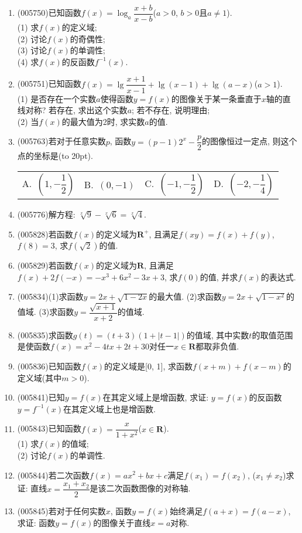 \documentclass[10pt,a4paper]{article}
\newcommand{\bracket}[1]{(\hbox to #1pt{})}
\newcommand{\fourch}[4]{\par\begin{tabular}{p{.23\textwidth}p{.23\textwidth}p{.23\textwidth}p{.23\textwidth}}
A.~#1 &B.~#2& C.~#3& D.~#4
\end{tabular}}
\begin{document}
\begin{enumerate}[1.]
\item {\tiny (005750)}已知函数$f(x)=\log_a\dfrac{x+b}{x-b}$($a>0$, $b>0$且$a\ne 1$).\\
(1) 求$f(x)$的定义域;\\
(2) 讨论$f(x)$的奇偶性;\\
(3) 讨论$f(x)$的单调性;\\
(4) 求$f(x)$的反函数$f^{-1}(x)$.
\item {\tiny (005751)}已知函数$f(x)=\lg \dfrac{x+1}{x-1}+\lg (x-1)+\lg (a-x)$($a>1$).\\
(1) 是否存在一个实数$a$使得函数$y=f(x)$的图像关于某一条垂直于$x$轴的直线对称? 若存在, 求出这个实数$a$; 若不存在, 说明理由;\\
(2) 当$f(x)$的最大值为2时, 求实数$a$的值.
\item {\tiny (005763)}若对于任意实数$p$, 函数$y=(p-1)2^x-\dfrac p2$的图像恒过一定点, 则这个点的坐标是\bracket{20}.
\fourch{$(1,-\dfrac 12)$}{$(0, -1)$}{$(-1,-\dfrac 12)$}{$(-2,-\dfrac 14)$}
\item {\tiny (005776)}解方程: $\sqrt[x]9-\sqrt[x]6=\sqrt[x]4$.
\item {\tiny (005828)}若函数$f(x)$的定义域为$\mathbf{R}^+$, 且满足$f(xy)=f(x)+f(y)$, $f(8)=3$, 求$f(\sqrt 2)$的值.
\item {\tiny (005829)}若函数$f(x)$的定义域为$\mathbf{R}$, 且满足$f(x)+2f(-x)=-x^3+6x^2-3x+3$, 求$f(0)$的值, 并求$f(x)$的表达式.
\item {\tiny (005834)}(1)求函数$y=2x+\sqrt {1-2x}$的最大值.
(2)求函数$y=2x+\sqrt {1-x^2}$的值域.
(3)求函数$y=\dfrac{\sqrt {x+1}}{x+2}$的值域.
\item {\tiny (005835)}求函数$g(t)=(t+3)(1+|t-1|)$的值域, 其中实数$t$的取值范围是使函数$f(x)=x^2-4tx+2t+30$对任一$x\in \mathbf{R}$都取非负值.
\item {\tiny (005836)}已知函数$f(x)$的定义域是[0, 1], 求函数$f(x+m)+f(x-m)$的定义域(其中$m>0$).
\item {\tiny (005841)}已知$y=f(x)$在其定义域上是增函数, 求证: $y=f(x)$的反函数$y=f^{-1}(x)$在其定义域上也是增函数.
\item {\tiny (005843)}已知函数$f(x)=\dfrac x{1+x^2}$($x\in \mathbf{R}$).\\
(1) 求$f(x)$的值域;\\
(2) 讨论$f(x)$的单调性.
\item {\tiny (005844)}若二次函数$f(x)=ax^2+bx+c$满足$f(x_1)=f(x_2)$, ($x_1\ne x_2$)求证: 直线$x=\dfrac{x_1+x_2}2$是该二次函数图像的对称轴.
\item {\tiny (005845)}若对于任何实数$x$, 函数$y=f(x)$始终满足$f(a+x)=f(a-x)$, 求证: 函数$y=f(x)$的图像关于直线$x=a$对称.

\end{enumerate}
\end{document}
